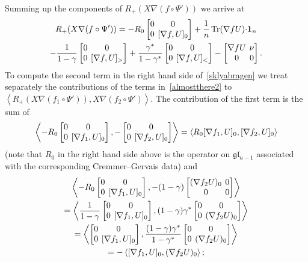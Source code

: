 \documentclass{amsart}
\theoremstyle{definition}
\theoremstyle{remark}
\numberwithin{equation}{section}
\numberwithin{theorem}{section}
\def\nablac{{\nabla}}
\def\gl{\mathfrak g\mathfrak l}
\def\nar{\setlength\arraycolsep{2pt}}
\def\one{\mathbf 1}
\def\Tr{\operatorname{Tr}}
\begin{document}
Summing up the components of $R_+(X\nabla (f\circ\Psi'))$ we arrive at
\begin{multline}\label{almostthere2}
R_+(X\nabla (f\circ\Psi'))= -R_0\nar\begin{bmatrix} 0 & 0\cr 0 & [\nablac f, U]_0\end{bmatrix}
+\frac1n\Tr (\nabla f U){\cdot}\one_n\\
-\frac1{1-\gamma}\nar\begin{bmatrix} 0 & 0\cr 0 & [\nablac f, U]_>\end{bmatrix}
+\frac{\gamma^*}{1-\gamma^*}\begin{bmatrix} 0 & 0\cr 0 & [\nablac f, U]_< \end{bmatrix}
-\begin{bmatrix}\nablac f U&\nu\cr 0 & 0\end{bmatrix}.
\end{multline}
To compute the second term in the right hand side of~\eqref{sklyabragen} we treat separately the contributions of
the terms in~\eqref{almostthere2} to $\left\langle  R_+(X\nabla(f_1\circ\Psi') ),X\nabla(f_2\circ\Psi') \right\rangle$.
The contribution of the first term is the sum of
\[
\left\langle -R_0\nar\begin{bmatrix} 0 & 0\cr 0 & [\nablac f_1, U]_0\end{bmatrix},
-\begin{bmatrix} 0 & 0\cr 0 & [\nablac f_2, U]_0\end{bmatrix}\right\rangle=
\left\langle R_0[\nablac f_1, U]_0,[\nablac f_2, U]_0\right\rangle
\]
(note that $R_0$ in the right hand side above  is the operator on $\gl_{n-1}$ associated with the corresponding Cremmer--Gervais data)
and
\begin{multline*}
\left\langle -R_0\nar\begin{bmatrix} 0 & 0\cr 0 & [\nablac f_1, U]_0\end{bmatrix},
-(1-\gamma)\begin{bmatrix} (\nablac f_2 U)_0 & 0\cr 0 & 0\end{bmatrix}\right\rangle\\=
\left\langle \frac1{1-\gamma}\nar\begin{bmatrix} 0 & 0\cr 0 & [\nablac f_1, U]_0\end{bmatrix},
(1-\gamma)\gamma^*\begin{bmatrix} 0 & 0\cr 0& (\nablac f_2 U)_0 \end{bmatrix}\right\rangle\\=
\left\langle \nar\begin{bmatrix} 0 & 0\cr 0 & [\nablac f_1, U]_0\end{bmatrix},
\frac{(1-\gamma)\gamma^*}{1-\gamma^*}\begin{bmatrix} 0 & 0\cr 0& (\nablac f_2 U)_0 \end{bmatrix}\right\rangle\\=
-\left\langle [\nablac f_1, U]_0,(\nablac f_2 U)_0\right\rangle;
\end{multline*}
\end{document}
